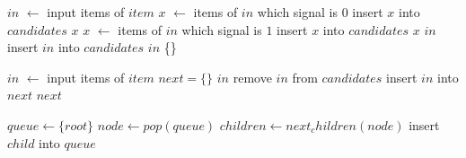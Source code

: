 \documentclass[12pt,a4paper]{article}
\begin{document}
{\linespread{1}

\begin{algorithm}
\caption{$static\_analysis(candidates, item)$}
\begin{algorithmic}[1]
\STATE $in$ $\leftarrow$ input items of $item$
    \STATE $x$ $\leftarrow$ items of $in$ which signal is $0$
        \STATE insert $x$ into $candidates$
        \RETURN $x$
    \ENDIF
{}
    \STATE $x$ $\leftarrow$ items of $in$ which signal is $1$
        \STATE insert $x$ into $candidates$
        \RETURN $x$
    \ENDIF
{}
    \RETURN $in$
\ELSE
    \STATE insert $in$ into $candidates$
    \RETURN $in$
\ENDIF
\RETURN \{\}
\end{algorithmic}
\end{algorithm}

\begin{algorithm}
\caption{$dynamic\_analysis(candidates, item)$}
\begin{algorithmic}[1]
\STATE $in$ $\leftarrow$ input items of $item$
\STATE $next = \{\}$
    \RETURN $in$
\ENDIF
{}
        \STATE remove $in$ from $candidates$
        \STATE insert $in$ into $next$
    \ENDIF
\ENDFOR
\RETURN $next$
\end{algorithmic}
\end{algorithm}

\begin{algorithm}
\caption{$breadth\_first\_traversal(root, next\_children)$}
\begin{algorithmic}[1]
\STATE $queue \leftarrow \{root\}$
    \STATE $node \leftarrow pop(queue)$
    \STATE $children \leftarrow next_children(node)$
    \STATE insert $child$ into $queue$
\ENDWHILE
\end{algorithmic}
\end{algorithm}

}
\end{document}
